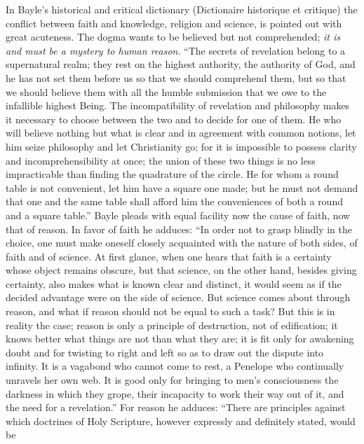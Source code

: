 \documentclass[12pt]{book}
\newcommand{\opage}[1]{\marginnote{\footnotesize\textit{[#1]}}}
\begin{document}
In Bayle's historical and critical dictionary (Dictionaire historique et
critique) the conflict between faith and knowledge, religion and science, is
pointed out with great acuteness. The dogma wants to be believed but not
comprehended; \emph{it is and must be a mystery to human reason}. ``The
secrets of revelation belong to a supernatural realm; they rest on the highest
authority,
\opage{268}\setcounter{footnote}{0}%
the authority of God, and he has not set them before us so that we should
comprehend them, but so that we should believe them with all the humble
submission that we owe to the infallible highest Being. The incompatibility of
revelation and philosophy makes it necessary to choose between the two and to
decide for one of them. He who will believe nothing but what is clear and in
agreement with common notions, let him seize philosophy and let Christianity
go; for it is impossible to possess clarity and incomprehensibility at once;
the union of these two things is no less impracticable than finding the
quadrature of the circle. He for whom a round table is not convenient, let him
have a square one made; but he must not demand that one and the same table
shall afford him the conveniences of both a round and a square table.'' Bayle
pleads with equal facility now the cause of faith, now that of reason. In
favor of faith he adduces: ``In order not to grasp blindly in the choice, one
must make oneself closely acquainted with the nature of both sides, of faith
and of science. At first glance, when one hears that faith is a certainty
whose object remains obscure, but that science, on the other hand, besides
giving certainty, also makes what is known clear and distinct, it would seem
as if the decided advantage were on the side of science. But science comes
about through reason, and what if reason should not be equal to such a task?
But this is in reality the case; reason is only a principle of destruction,
not of edification; it knows better what things are not than what they are; it
is fit only for awakening doubt and for twisting to right and left so as to
draw out the dispute into infinity. It is a vagabond who cannot come to rest,
a Penelope who continually unravels her own
\opage{269}\setcounter{footnote}{0}%
web. It is good only for bringing to men's consciousness the darkness in which
they grope, their incapacity to work their way out of it, and the need for a
revelation.'' For reason he adduces: ``There are principles against which
doctrines of Holy Scripture, however expressly and definitely stated, would be
\end{document}
